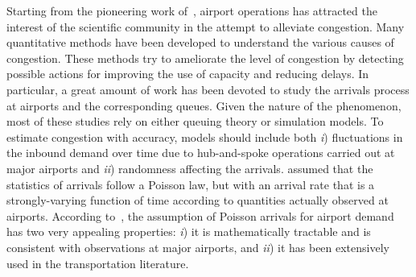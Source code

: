 \documentclass[draft,review]{elsarticle}
\begin{document}
Starting from the pioneering work of~\citet{Blum1959}, airport operations has attracted the interest of the scientific community in the attempt to alleviate congestion.
Many quantitative methods have been developed to understand the various causes of congestion.
These methods try to ameliorate the level of congestion by detecting possible actions for improving the use of capacity and reducing delays.
In particular, a great amount of work has been devoted to study the arrivals process at airports and the corresponding queues.
Given the nature of the phenomenon, most of these studies rely on either queuing theory or simulation models. To  estimate congestion with accuracy, models should include both \emph{i}) fluctuations in the inbound demand over time due to hub-and-spoke operations carried out at major airports and \emph{ii}) randomness affecting the arrivals. \citeauthor{Koop1972} assumed that the statistics of arrivals follow a Poisson law, but with an arrival rate that is a strongly-varying function of time according to quantities actually observed at airports.
According to~\citet{HO1975}, the assumption of Poisson arrivals for airport demand has two very appealing properties:
\emph{i}) it is mathematically tractable and is consistent with observations at major airports, and
\emph{ii}) it has been extensively used in the transportation literature.
\end{document}

